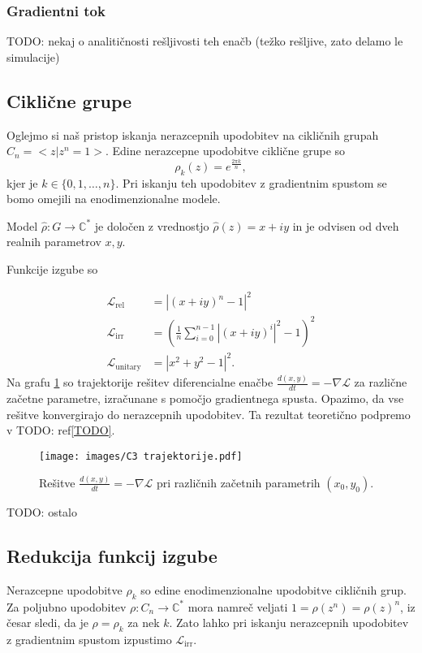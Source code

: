 \documentclass[mat2, tisk]{fmfdelo}
\newcommand{\TODO}[1]{{\color{blue} TODO: #1}}
\newcommand{\loss }{\mathcal L}
\newcommand{\Loss}[1]{\mathcal L _\text{#1}}
\newcommand{\C}{\mathbb C}
\begin{document}
     \subsubsection{Gradientni tok}
     \TODO{nekaj o analitičnosti rešljivosti teh enačb (težko rešljive, zato delamo le simulacije)}
    \subsection{Ciklične grupe}
    Oglejmo si naš pristop iskanja nerazcepnih upodobitev na cikličnih grupah $C_n = <z | z^n=1>$. Edine nerazcepne upodobitve ciklične grupe so 
    $$
    \rho_k(z) = e^\frac{2 \pi k}{n},
    $$
    kjer je $k \in \{0, 1, \dotsc, n\}$. Pri iskanju teh upodobitev z gradientnim spustom se bomo omejili na enodimenzionalne modele.
    
    Model $\hat\rho \colon G \to \C^*$ je določen z vrednostjo $\hat\rho(z) = x + iy$ in je odvisen od dveh realnih parametrov $x, y$. 

    Funkcije izgube so
    
    \begin{align}
        \label{eq:loss function Cn}
        \Loss{rel} &= |(x + iy)^n -1|^2\\
        \Loss{irr} &= (\frac{1}{n} \sum_{i=0}^{n-1} |(x + iy)^i|^2 -1)^2 \\
        \Loss{unitary} &= | x^2 + y^2 -1|^2.
        \end{align}
Na grafu \ref{fig:ciklicna-trajektorije} so trajektorije rešitev diferencialne enačbe $\frac{d(x,y)}{dt} = -\nabla \loss$ za različne začetne parametre, izračunane s pomočjo gradientnega spusta. Opazimo, da vse rešitve konvergirajo do nerazcepnih upodobitev. Ta rezultat teoretično podpremo v \TODO{ref}\ref{TODO}.
        \begin{figure}[ht]
            \centering
            \texttt{[image: images/C3 trajektorije.pdf]}
            \caption{Rešitve $\frac{d(x,y)}{dt} = -\nabla \loss$ pri različnih začetnih parametrih $(x_0, y_0)$.}
            \label{fig:ciklicna-trajektorije}
        \end{figure}
        \TODO{ostalo}
    \subsection{Redukcija funkcij izgube}
    Nerazcepne upodobitve $\rho_k$ so edine enodimenzionalne upodobitve cikličnih grup. Za poljubno upodobitev $\rho \colon C_n \to \C^*$ mora namreč veljati $1 = \rho(z^n) = \rho(z)^n$, iz česar sledi, da je $\rho = \rho_k$ za nek $k$. 
    Zato lahko pri iskanju nerazcepnih upodobitev z gradientnim spustom izpustimo $\Loss{irr}$. 
    
\end{document}
